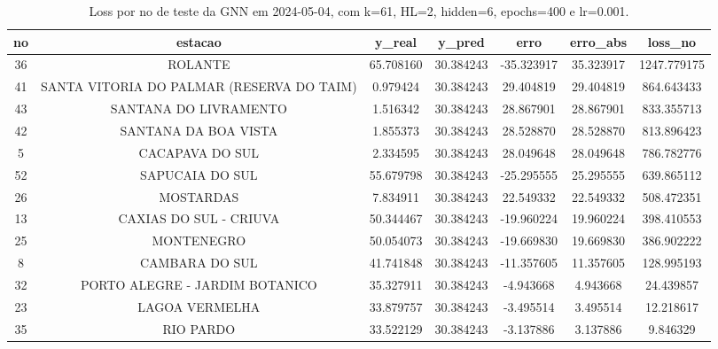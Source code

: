 \begin{table}[h]
\centering
\caption{Loss por no de teste da GNN em 2024-05-04, com k=61, HL=2, hidden=6, epochs=400 e lr=0.001.}
\label{tab:gnn_loss_k61_hl2_h6_e400_d20240504}
\begin{tabular}{ccccccc}
\toprule
no & estacao & y\_real & y\_pred & erro & erro\_abs & loss\_no \\
\midrule
36 & ROLANTE & 65.708160 & 30.384243 & -35.323917 & 35.323917 & 1247.779175 \\
41 & SANTA VITORIA DO PALMAR (RESERVA DO TAIM) & 0.979424 & 30.384243 & 29.404819 & 29.404819 & 864.643433 \\
43 & SANTANA DO LIVRAMENTO & 1.516342 & 30.384243 & 28.867901 & 28.867901 & 833.355713 \\
42 & SANTANA DA BOA VISTA & 1.855373 & 30.384243 & 28.528870 & 28.528870 & 813.896423 \\
5 & CACAPAVA DO SUL & 2.334595 & 30.384243 & 28.049648 & 28.049648 & 786.782776 \\
52 & SAPUCAIA DO SUL & 55.679798 & 30.384243 & -25.295555 & 25.295555 & 639.865112 \\
26 & MOSTARDAS & 7.834911 & 30.384243 & 22.549332 & 22.549332 & 508.472351 \\
13 & CAXIAS DO SUL - CRIUVA & 50.344467 & 30.384243 & -19.960224 & 19.960224 & 398.410553 \\
25 & MONTENEGRO & 50.054073 & 30.384243 & -19.669830 & 19.669830 & 386.902222 \\
8 & CAMBARA DO SUL & 41.741848 & 30.384243 & -11.357605 & 11.357605 & 128.995193 \\
32 & PORTO ALEGRE - JARDIM BOTANICO & 35.327911 & 30.384243 & -4.943668 & 4.943668 & 24.439857 \\
23 & LAGOA VERMELHA & 33.879757 & 30.384243 & -3.495514 & 3.495514 & 12.218617 \\
35 & RIO PARDO & 33.522129 & 30.384243 & -3.137886 & 3.137886 & 9.846329 \\
\bottomrule
\end{tabular}
\end{table}
